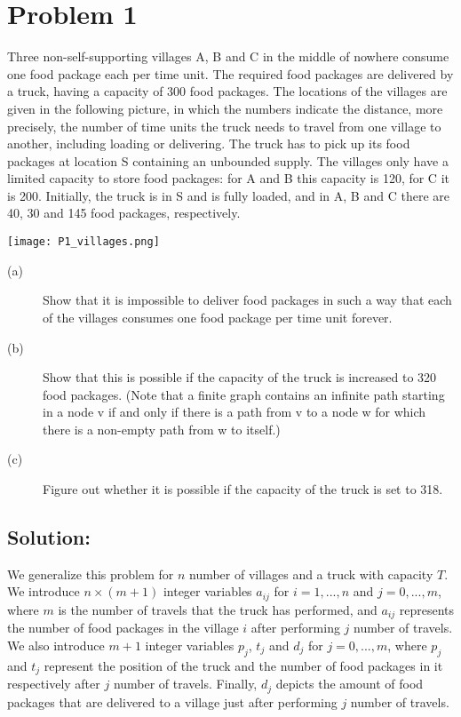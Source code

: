 \section*{Problem 1}

Three non-self-supporting villages A, B and C in the middle of nowhere consume one food package each per time unit. The required food packages are delivered by a truck, having a capacity of 300 food packages. The locations of the villages are given in the following picture, in which the numbers indicate the distance, more precisely, the number of time units the truck needs to travel from one village to another, including loading or delivering. The truck has to pick up its food packages at location S containing an unbounded supply. The villages only have a limited capacity to store food packages: for A and B this capacity is 120, for C it is 200. Initially, the truck is in S and is fully loaded, and in A, B and C there are 40, 30 and 145 food packages, respectively.

\begin{center}
\texttt{[image: P1\_villages.png]}
\end{center}

\begin{description}
  \item[(a)] Show that it is impossible to deliver food packages in such a way that each of the villages consumes one food package per time unit forever.
  \item[(b)]  Show that this is possible if the capacity of the truck is increased to 320 food packages. (Note that a finite graph contains an infinite path starting in a node v if and only if there is a path from v to a node w for which there is a non-empty path from w to itself.)
  \item[(c)]  Figure out whether it is possible if the capacity of the truck is set to 318.
\end{description}

\subsection*{Solution:}

We generalize this problem for $n$ number of villages and a truck with capacity $T$. We introduce $n\times (m+1)$ integer variables $a_{ij}$ for $i=1,...,n$ and $j=0,...,m$, where $m$ is the number of travels that the truck has performed, and $a_{ij}$ represents the number of food packages in the village $i$ after performing $j$ number of travels. We also introduce $m+1$ integer variables $p_j$, $t_j$ and $d_j$ for $j=0,...,m$, where $p_j$ and $t_j$ represent the position of the truck and the number of food packages in it respectively after $j$ number of travels. Finally, $d_j$ depicts the amount of food packages that are delivered to a village just after performing $j$ number of travels.

